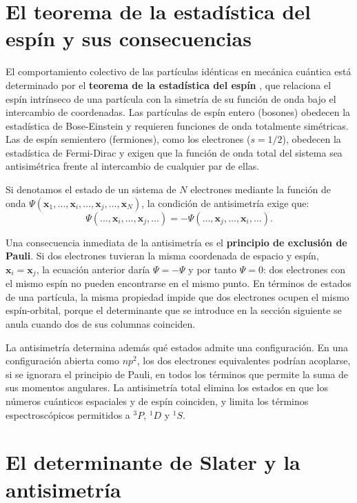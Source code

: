 \section{El teorema de la estadística del espín y sus consecuencias}

El comportamiento colectivo de las partículas idénticas en mecánica cuántica está determinado por el \textbf{teorema de la estadística del espín} \parencite{Pauli1940}, que relaciona el espín intrínseco de una partícula con la simetría de su función de onda bajo el intercambio de coordenadas. Las partículas de espín entero (bosones) obedecen la estadística de Bose-Einstein y requieren funciones de onda totalmente simétricas. Las de espín semientero (fermiones), como los electrones ($s = 1/2$), obedecen la estadística de Fermi-Dirac y exigen que la función de onda total del sistema sea antisimétrica frente al intercambio de cualquier par de ellas.

Si denotamos el estado de un sistema de $N$ electrones mediante la función de onda $\Psi(\bm{x}_1, \dots, \bm{x}_i, \dots, \bm{x}_j, \dots, \bm{x}_N)$, la condición de antisimetría exige que:
\begin{equation}
    \Psi(\dots, \bm{x}_i, \dots, \bm{x}_j, \dots) = -\Psi(\dots, \bm{x}_j, \dots, \bm{x}_i, \dots).
\end{equation}

Una consecuencia inmediata de la antisimetría es el \textbf{principio de exclusión de Pauli}. Si dos electrones tuvieran la misma coordenada de espacio y espín, $\bm{x}_i = \bm{x}_j$, la ecuación anterior daría $\Psi = -\Psi$ y por tanto $\Psi = 0$: dos electrones con el mismo espín no pueden encontrarse en el mismo punto. En términos de estados de una partícula, la misma propiedad impide que dos electrones ocupen el mismo espín-orbital, porque el determinante que se introduce en la sección siguiente se anula cuando dos de sus columnas coinciden.
    
La antisimetría determina además qué estados admite una configuración. En una configuración abierta como $np^2$, los dos electrones equivalentes podrían acoplarse, si se ignorara el principio de Pauli, en todos los términos que permite la suma de sus momentos angulares. La antisimetría total elimina los estados en que los números cuánticos espaciales y de espín coinciden, y limita los términos espectroscópicos permitidos a $^3P$, $^1D$ y $^1S$.

\section{El determinante de Slater y la antisimetría}

